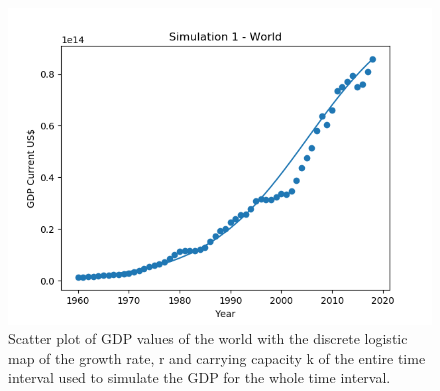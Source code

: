 \documentclass[11pt,a4paper]{CLabBookTemplate} %
\begin{document}
\begin{figure}[h!]
	\centering
	\includegraphics[width = 120mm]{Figures/WorldSim.png}
	\caption{Scatter plot of GDP values of the world with the discrete logistic map of the growth rate, r and carrying capacity k of the entire time interval used to simulate the GDP for the whole time interval.}
	\label{fig:WorldSim}
\end{figure}


\clearpage
\printmybibliography
\end{document}
